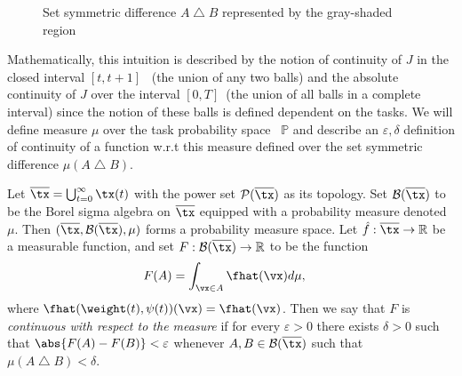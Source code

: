 \begin{figure}
    \centering
    \caption{Set symmetric difference $A\bigtriangleup B$ represented by the gray-shaded region }
    \label{fig:setsim}
\end{figure}
Mathematically, this intuition is described by the notion of continuity
of $J$ in the closed interval $[t, t+1]$ ~(the union of any two balls) and the absolute continuity of $J$ over the interval  $[0,T]$~(the union of all balls in a complete interval) since the notion of these balls is defined dependent on the tasks. We will define measure $\mu$ over the task probability space ~$\mathbb{P}$ and describe an $\varepsilon, \delta$ definition of 
continuity of a function w.r.t this measure defined over the set symmetric difference $\mu(A\bigtriangleup B)$.
\begin{definition} \label{defintersect}
     Let $\overline{\tx} = \bigcup_{t=0}^\infty \tx(t)$ with the power set $\mathcal{P(\overline{\tx})}$ as its topology. Set $\mathcal{B(\overline{\tx})}$ to be the Borel sigma algebra on $\overline{\tx}$ equipped with a probability measure denoted $\mu.$ Then $(\overline{\tx},\mathcal{B}(\overline{\tx}), \mu)$ forms a probability measure space. Let $\hat{f}: \overline{\tx}\rightarrow \mathbb{R}$ be a measurable function, and set $F:\mathcal{B}(\overline{\tx})\rightarrow \mathbb{R}$ to be the function
     \begin{align*}
         F(A) & = \int_{\vx \in A} \fhat(\vx) d\mu,
     \end{align*}
     where $\fhat(\weight(t),\psi(t))( \vx )  = \fhat(\vx)$.
     Then we say that $F$ is \textit{continuous with respect to the measure} if for every $\varepsilon>0$ there exists $\delta >0$ such that $\abs{F(A)-F(B)} < \varepsilon$
     whenever $A,B\in \mathcal{B(\overline{\tx})}$ such that $\mu(A\bigtriangleup B)<\delta.$
 \end{definition}
 
